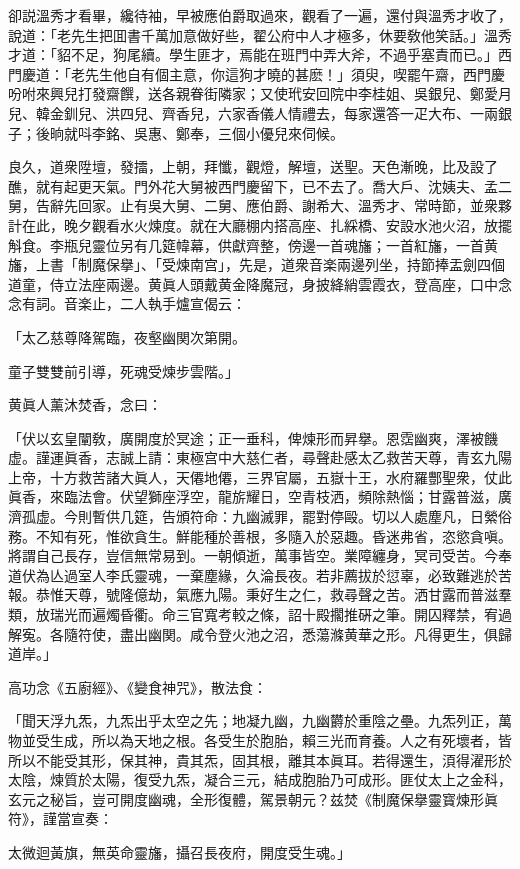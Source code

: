 卻説溫秀才看畢，纔待袖，早被應伯爵取過來，觀看了一遍，還付與溫秀才收了，說道：「老先生把囬書千萬加意做好些，翟公府中人才極多，休要敎他笑話。」溫秀才道：「貂不足，狗尾續。學生匪才，焉能在班門中弄大斧，不過乎塞責而已。」西門慶道：「老先生他自有個主意，你這狗才曉的甚麽！」須臾，喫罷午齋，西門慶吩咐來興兒打發齋饌，送各親眷街隣家；又使玳安回院中李桂姐、吳銀兒、鄭愛月兒、韓金釧兒、洪四兒、齊香兒，六家香儀人情禮去，每家還答一疋大布、一兩銀子；後晌就呌李銘、吳惠、鄭奉，三個小優兒來伺候。

良久，道衆陞壇，發擂，上朝，拜懺，觀燈，解壇，送聖。天色漸晚，比及設了醮，就有起更天氣。門外花大舅被西門慶留下，已不去了。喬大戶、沈姨夫、孟二舅，告辭先回家。止有吳大舅、二舅、應伯爵、謝希大、溫秀才、常時節，並衆夥計在此，晚夕觀看水火煉度。就在大廳棚内搭高座、扎綵橋、安設水池火沼，放擺斛食。李瓶兒靈位另有几筵幃幕，供獻齊整，傍邊一首魂旛；一首紅旛，一首黄旛，上書「制魔保擧」、「受煉南宫」，先是，道衆音楽兩邊列坐，持節捧盂劍四個道童，侍立法座兩邊。黄眞人頭戴黄金降魔冠，身披絳綃雲霞衣，登高座，口中念念有詞。音楽止，二人執手爐宣偈云：

\begin{myquote}
「太乙慈尊降駕臨，夜壑幽関次第開。

童子雙雙前引導，死魂受煉步雲階。」
\end{myquote}

黄眞人薰沐焚香，念曰：

\begin{myquote}[\markfont]
「伏以玄皇闡敎，廣開度於冥途；正一垂科，俾煉形而昇擧。恩霑幽爽，澤被饑虚。謹運眞香，志誠上請：東極宫中大慈仁者，尋聲赴感太乙救苦天尊，青玄九陽上帝，十方救苦諸大眞人，天僊地僊，三界官屬，五嶽十王，水府羅酆聖衆，仗此眞香，來臨法會。伏望獅座浮空，龍旂耀日，空青枝洒，頻除熱惱；甘露普滋，廣濟孤虚。今則暫供几筵，告頒符命：九幽滅罪，罷對停毆。切以人處塵凡，日縈俗務。不知有死，惟欲貪生。鮮能種於善根，多隨入於惡趣。昏迷弗省，恣慾貪嗔。將謂自己長存，豈信無常易到。一朝傾逝，萬事皆空。業障纏身，冥司受苦。今奉道伏為亾過室人李氏靈魂，一棄塵緣，久淪長夜。若非薦拔於愆辜，必致難逃於苦報。恭惟天尊，號隆億劫，氣應九陽。秉好生之仁，救尋聲之苦。洒甘露而普滋羣類，放瑞光而遍燭昏衢。命三官寬考較之條，詔十殿擱推硏之筆。開囚釋禁，宥過解寃。各隨符使，盡出幽関。咸令登火池之沼，悉蕩滌黄華之形。凡得更生，俱歸道岸。」
\end{myquote}

高功念《五廚經》、《變食神咒》，散法食：

\begin{myquote}[\markfont]
「聞天浮九炁，九炁出乎太空之先；地凝九幽，九幽欝於重陰之壘。九炁列正，萬物並受生成，所以為天地之根。各受生於胞胎，賴三光而育養。人之有死壞者，皆所以不能受其形，保其神，貴其炁，固其根，離其本眞耳。若得還生，湏得濯形於太陰，煉質於太陽，復受九炁，凝合三元，結成胞胎乃可成形。匪仗太上之金科，玄元之秘旨，豈可開度幽魂，全形復體，駕景朝元？兹焚《制魔保擧靈寳煉形眞符》，謹當宣奏：

太微迴黃旗，無英命靈旛，攝召長夜府，開度受生魂。」
\end{myquote}

